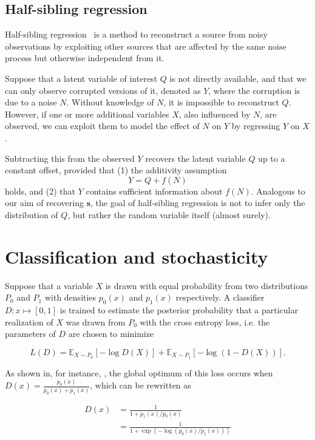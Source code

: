 \subsection{Half-sibling regression}
\label{sec:hsr}
Half-sibling regression~\cite{scholkopf2016modeling} is a method to reconstruct a source from noisy observations by exploiting other sources that are affected by the same noise process but otherwise independent from it.

Suppose that a latent variable of interest $Q$ is not directly available, and that we can only observe corrupted versions of it, denoted as  $Y$, where the corruption is due to a noise $N$.
Without knowledge of $N$, it is impossible to reconstruct $Q$. However, if one or more additional variables $X$, also influenced by $N$, are observed, we can exploit them to model the effect of $N$ on $Y$ by regressing $Y$ on $X$.

Subtracting this from the observed $Y$ recovers the latent variable $Q$ up to a constant offset,
provided that (1) the additivity assumption
\[
Y = Q + f(N)
\]
holds, and (2) that $Y$ contains sufficient information about $f(N)$.
Analogous to our aim of recovering $\bm{s}$,
the goal of half-sibling regression is not to infer only the distribution of $Q$, but rather the random variable itself (almost surely).

\section{Classification and stochasticity}
\label{sec:converged}
Suppose that a variable $X$ is drawn with equal probability from two distributions $P_0$ and $P_1$ with densities $p_0(x)$ and $p_1(x)$ respectively.
A classifier $D: x \mapsto [0,1]$ is trained to estimate the posterior probability that a particular realization of $X$ was drawn from $P_0$ with the cross entropy loss, i.e. the parameters of $D$ are chosen to minimize

\[
L(D) = \mathbb{E}_{X\sim P_0} \left[ - \log D(X) \right] + \mathbb{E}_{X\sim P_1} \left[ - \log (1 - D(X)) \right].
\]

As shown in, for instance, \cite{goodfellow2014generative}, the global optimum of this loss occurs when $D(x) = \frac{p_0(x)}{p_0(x) + p_1(x)}$, which can be rewritten as

\begin{align}
D(x) &= \frac{1}{1 + p_1(x)/p_0(x)}\\
&= \frac{1}{1 + \exp ( - \log (p_0(x)/p_1(x))) } \label{eq:density-ratio-classification}
\end{align}

